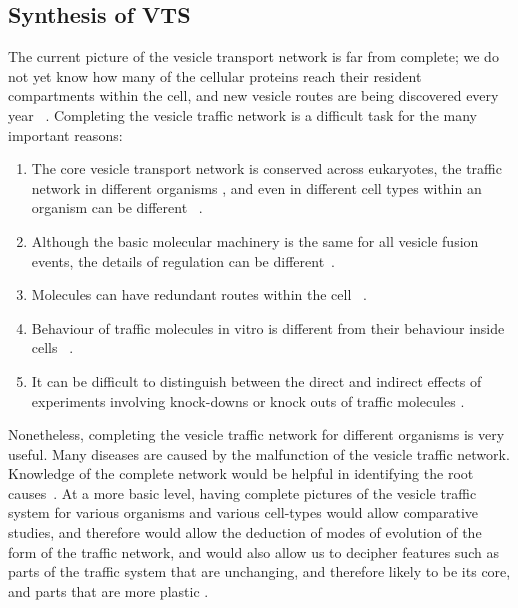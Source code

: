 \subsection{Synthesis of VTS }
\noindent The current picture of the vesicle transport network is far from complete; we do not yet know how many of the cellular proteins reach their resident compartments within the cell, and new vesicle routes are being discovered every year ~\cite{nickel2018unconventional,weill2018toolbox}. 
%
Completing the vesicle traffic network is a difficult task for the many important reasons: 
\begin{enumerate}
	\item The core vesicle transport network is conserved across eukaryotes, the traffic network in different organisms \cite{richardson2015evolutionary,nishimoto2009differential,barlow2017seeing}, and even in different cell types within an organism can be different ~\cite{stoops2014trafficking,zhou2015arp2}.
	
	\item Although the basic molecular machinery is the same for all vesicle fusion events, the details of regulation can be different~\cite{davletov2007regulation,di2010calcium}.
	
	\item Molecules can have redundant routes within the cell ~\cite{shimizu2014compensatory,nakatsukasa2014nutrient}.
	\item Behaviour of traffic molecules in vitro is different from their behaviour inside cells ~\cite{furukawa2014multiple}. 
	
	
	\item It can be difficult to distinguish between the direct and indirect effects of experiments involving knock-downs or knock outs of traffic molecules \cite{hirst2004epsinr,mishev2013small}.
\end{enumerate}

Nonetheless, completing the vesicle traffic network for different organisms is very useful. 
%
Many diseases are caused by the malfunction of the vesicle traffic network. 
%
Knowledge of the complete network would be helpful in identifying the root causes~\cite{bexiga2013human,gissen2007cargos}. 
%
At a more basic level, having complete pictures of the vesicle traffic system for various organisms and various cell-types would allow comparative studies, and therefore would allow the deduction of modes of evolution of the form of the traffic network, and would also allow us to decipher features such as parts of the traffic system that are unchanging, and therefore likely to be its core, and parts that are more plastic \cite{barlow2017seeing}.

